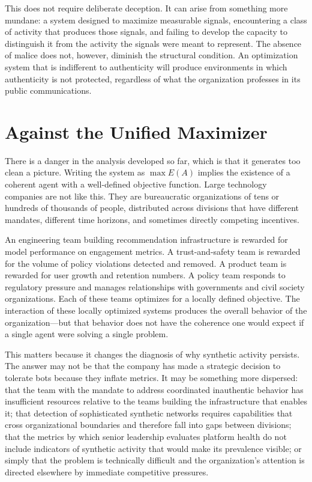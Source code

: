 \documentclass[12pt, a4paper]{article}
\begin{document}
This does not require deliberate deception. It can arise from something more mundane: a system designed to maximize measurable signals, encountering a class of activity that produces those signals, and failing to develop the capacity to distinguish it from the activity the signals were meant to represent. The absence of malice does not, however, diminish the structural condition. An optimization system that is indifferent to authenticity will produce environments in which authenticity is not protected, regardless of what the organization professes in its public communications.

\section{Against the Unified Maximizer}

There is a danger in the analysis developed so far, which is that it generates too clean a picture. Writing the system as $\max E(A)$ implies the existence of a coherent agent with a well-defined objective function. Large technology companies are not like this. They are bureaucratic organizations of tens or hundreds of thousands of people, distributed across divisions that have different mandates, different time horizons, and sometimes directly competing incentives.

An engineering team building recommendation infrastructure is rewarded for model performance on engagement metrics. A trust-and-safety team is rewarded for the volume of policy violations detected and removed. A product team is rewarded for user growth and retention numbers. A policy team responds to regulatory pressure and manages relationships with governments and civil society organizations. Each of these teams optimizes for a locally defined objective. The interaction of these locally optimized systems produces the overall behavior of the organization---but that behavior does not have the coherence one would expect if a single agent were solving a single problem.

This matters because it changes the diagnosis of why synthetic activity persists. The answer may not be that the company has made a strategic decision to tolerate bots because they inflate metrics. It may be something more dispersed: that the team with the mandate to address coordinated inauthentic behavior has insufficient resources relative to the teams building the infrastructure that enables it; that detection of sophisticated synthetic networks requires capabilities that cross organizational boundaries and therefore fall into gaps between divisions; that the metrics by which senior leadership evaluates platform health do not include indicators of synthetic activity that would make its prevalence visible; or simply that the problem is technically difficult and the organization's attention is directed elsewhere by immediate competitive pressures.
\end{document}
